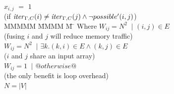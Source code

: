 \begin{tabbing}
\\[0.5ex]
           \> $x_{i,j}$    \> $=$   \> $1$             \>       \>            \\
           \> (if $\mathit{iter}_{\Gamma,C}(i) \not= \mathit{iter}_{\Gamma,C}(j) \wedge \neg possible'(i,j)$) 
\\[0.5ex]
MMMMM   \= MMMM \= M \= \kill
Where      \> $W_{ij} = N^2$ \> $~|$ \> $(i,j) \in E $         \\
           \> \> \> (fusing $i$ and $j$ will reduce memory traffic)         \\
           \> $W_{ij} = N^2$ \> $~|$ \> $\exists k. (k,i) \in E \wedge (k,j) \in E $     \\
           \> \> \> ($i$ and $j$ share an input array)                                         \\
           \> $W_{ij} = 1$   \> $~|$ \> $@otherwise@$                                                  \\
           \> \> \> (the only benefit is loop overhead)                                        
\\
           \> $N = |V|$
\end{tabbing}


